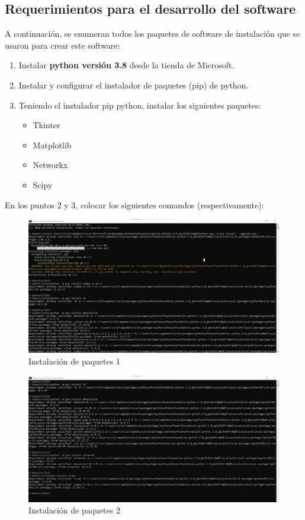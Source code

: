 \documentclass[12pt,a4paper]{book}
\begin{document}
	\subsection{Requerimientos para el desarrollo del software}
	A continuación, se enumeran todos los paquetes de software de instalación que se usaron para crear este software:
	\begin{enumerate}
		\item Instalar \textbf{python versión 3.8} desde la tienda de Microsoft.
		\item Instalar y configurar el instalador de paquetes (pip) de python.
		\item Teniendo el instalador pip python, instalar los siguientes paquetes:
		\begin{itemize}
			\item Tkinter
			\item Matplotlib
			\item Networkx
			\item Scipy
		\end{itemize}
	\end{enumerate}
	En los puntos 2 y 3, colocar los siguientes comandos (respectivamente):
	\begin{figure}[H]
		\centering
		\includegraphics[width=1\textwidth]{imagen5PC}
		\caption{Instalación de paquetes 1}
	\end{figure}
	\begin{figure}[H]
		\centering
		\includegraphics[width=1\textwidth]{imagen6PC}
		\caption{Instalación de paquetes 2}
	\end{figure}
\clearpage
\end{document}
